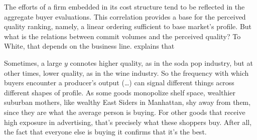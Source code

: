 \documentclass[a4paper, 12pt, openright, oneside, german, french, brazil, english]{abntex2}
\begin{document}
	
	The efforts of a firm embedded in its cost structure tend to be reflected in the aggregate buyer evaluations. This correlation provides a base for the perceived quality ranking, namely, a linear ordering sufficient to base market's profile. But what is the relations between commit volumes and the perceived quality? To White, that depends on the business line.  explains that
	
	
	\begin{citacao}
		Sometimes, a large $y$ connotes higher quality, as in the soda pop industry, but at other times, lower quality, as in the wine industry. So the frequency with which buyers encounter a producer's output (\dots) can signal different things across different shapes of profile. As some goods monopolize shelf space, wealthier suburban mothers, like wealthy East Siders in Manhattan, shy away from them, since they are what the average person is buying. For other goods that receive high exposure in advertising, that's precisely what these shoppers buy. After all, the fact that everyone else is buying it confirms that it's the best. \cite[p. 15]{white2002markets}
	\end{citacao}
	
	
\end{document}
